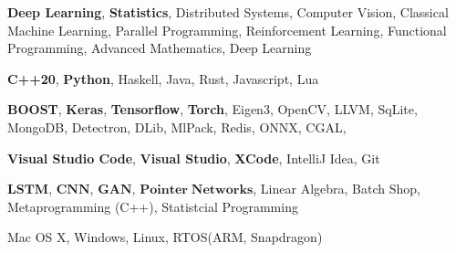 %
%
%


	\begin{keywords}
		
			{
				\textbf{Deep Learning}, 
				\textbf{Statistics},
				Distributed Systems,
				Computer Vision,
				Classical Machine Learning,
				Parallel Programming,
				Reinforcement Learning,
				Functional Programming,
				Advanced Mathematics,
				Deep Learning
			}
				
			{
				\textbf{C++20}, 
				\textbf{Python},
				 Haskell, 
				 Java, 
				 Rust, 
				 Javascript,
				 Lua
			}
			
			{
				\textbf{BOOST},
				\textbf{Keras},
				\textbf{Tensorflow}, 
				\textbf{Torch},
				Eigen3, 
				OpenCV,
				LLVM,
				SqLite,
				MongoDB,
				Detectron,
				DLib,
				MlPack,
				Redis,
				ONNX,
				CGAL, 
			}
		
			{
				\textbf{Visual Studio Code},
				\textbf{Visual Studio}, 
				\textbf{XCode},
				IntelliJ Idea, 
				Git
			}
		
		{
			$\mathbf{LSTM}$, $\mathbf{CNN}$, $\mathbf{GAN}$, 
			$\mathbf{Pointer \;Networks}$, Linear Algebra, Batch Shop, Metaprogramming (C++), Statistcial Programming
		}		
				
			{
				Mac OS X, 
				Windows, 
				Linux,
				RTOS(ARM, Snapdragon)
			}
	\end{keywords}